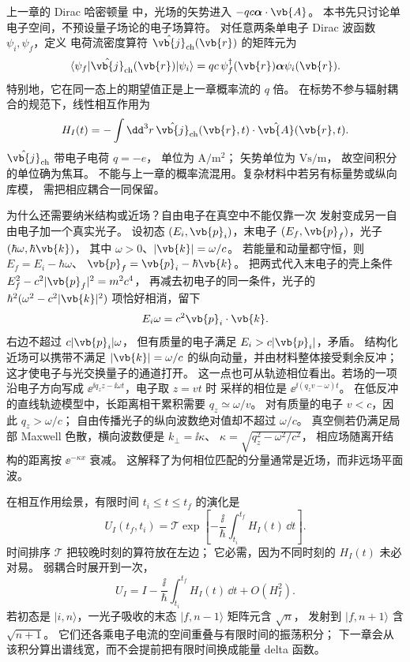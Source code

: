 上一章的 Dirac 哈密顿量 中，光场的矢势进入
\(-qc\boldsymbol\alpha\cdot\vb{A}\)。
本书先只讨论单电子空间，不预设量子场论的电子场算符。
对任意两条单电子 Dirac 波函数 \(\psi_i,\psi_f\)，定义
电荷流密度算符 \(\hat{\vb{j}}_{\rm ch}(\vb{r})\)
的矩阵元为
\[
\langle\psi_f|\hat{\vb{j}}_{\rm ch}(\vb{r})|\psi_i\rangle
=qc\,\psi_f^\dagger(\vb{r})
\boldsymbol\alpha\psi_i(\vb{r}).
\]
特别地，它在同一态上的期望值正是上一章概率流的 \(q\) 倍。
在标势不参与辐射耦合的规范下，线性相互作用为
\begin{equation}
H_I(t)
=-\int\dd^3r\,
\hat{\vb{j}}_{\rm ch}(\vb{r},t)
\cdot\hat{\vb{A}}(\vb{r},t).
\label{eq:feqo-current-field-coupling}
\end{equation}
\(\hat{\vb{j}}_{\rm ch}\) 带电子电荷 \(q=-e\)，
单位为 \(\si{\ampere\per\square\metre}\)；
矢势单位为 \(\si{\volt\second\per\metre}\)，
故空间积分的单位确为焦耳。
不能与上一章的概率流混用。复杂材料中若另有标量势或纵向库模，
需把相应耦合一同保留。

为什么还需要纳米结构或近场？自由电子在真空中不能仅靠一次
发射变成另一自由电子加一个真实光子。
设初态 \((E_i,\vb{p}_i)\)，末电子
\((E_f,\vb{p}_f)\)，光子 \((\hbar\omega,\hbar\vb{k})\)，
其中 \(\omega>0\)、\(|\vb{k}|=\omega/c\)。
若能量和动量都守恒，则
\(E_f=E_i-\hbar\omega\)、
\(\vb{p}_f=\vb{p}_i-\hbar\vb{k}\)。
把两式代入末电子的壳上条件
\(E_f^2-c^2|\vb{p}_f|^2=m^2c^4\)，
再减去初电子的同一条件，光子的
\(\hbar^2(\omega^2-c^2|\vb{k}|^2)\) 项恰好相消，留下
\[
E_i\omega=c^2\vb{p}_i\cdot\vb{k}.
\]
右边不超过 \(c|\vb{p}_i|\omega\)，
但有质量的电子满足 \(E_i>c|\vb{p}_i|\)，矛盾。
结构化近场可以携带不满足 \(|\vb{k}|=\omega/c\)
的纵向动量，并由材料整体接受剩余反冲；
这才使电子与光交换量子的通道打开。
这一点也可从轨迹相位看出。若场的一项沿电子方向写成
\(\ee^{\ii q_z z-\ii\omega t}\)，电子取 \(z=vt\) 时
采样的相位是 \(\ee^{\ii(q_zv-\omega)t}\)。
在低反冲的直线轨迹模型中，长距离相干累积需要
\(q_z\simeq\omega/v\)。
对有质量的电子 \(v<c\)，因此 \(q_z>\omega/c\)；
自由传播光子的纵向波数绝对值却不超过 \(\omega/c\)。
真空侧若仍满足局部 Maxwell 色散，横向波数便是
\(k_\perp=\ii\kappa\)、
\(\kappa=\sqrt{q_z^2-\omega^2/c^2}\)，
相应场随离开结构的距离按 \(\ee^{-\kappa x}\) 衰减。
这解释了为何相位匹配的分量通常是近场，而非远场平面波。

在相互作用绘景，有限时间 \(t_i\le t\le t_f\) 的演化是
\begin{equation}
U_I(t_f,t_i)=\mathcal T
\exp\!\left[-\frac{\ii}{\hbar}
\int_{t_i}^{t_f}H_I(t)\,\dd t\right].
\label{eq:feqo-interaction-propagator}
\end{equation}
时间排序 \(\mathcal T\) 把较晚时刻的算符放在左边；
它必需，因为不同时刻的 \(H_I(t)\) 未必对易。
弱耦合时展开到一次，
\[
U_I=I-\frac{\ii}{\hbar}\int_{t_i}^{t_f}H_I(t)\,\dd t
+O(H_I^2).
\]
若初态是 \(|i,n\rangle\)，一光子吸收的末态
\(|f,n-1\rangle\) 矩阵元含 \(\sqrt n\)，
发射到 \(|f,n+1\rangle\) 含 \(\sqrt{n+1}\)。
它们还各乘电子电流的空间重叠与有限时间的振荡积分；
下一章会从该积分算出谱线宽，而不会提前把有限时间换成能量 delta 函数。



